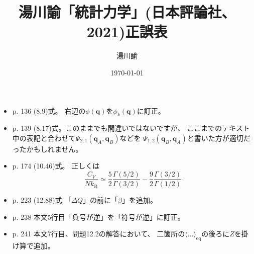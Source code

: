 \documentclass[dvipdfmx,uplatex]{jsarticle}
\begin{document}
\title{湯川諭「統計力学」(日本評論社、2021)正誤表}
\author{湯川諭}
\date{\today}
\maketitle
\begin{itemize}
\item
p. 136 (8.9)式。
右辺の$\phi(\boldsymbol{q})$を$\phi_{k}(\boldsymbol{q})$に訂正。
\item
p. 139 (8.17)式。このままでも間違いではないですが、
ここまでのテキスト中の表記と合わせて$\Psi_{2,1}(\boldsymbol{q}_{A}, \boldsymbol{q}_{B})$などを
$\Psi_{1,2}(\boldsymbol{q}_{B}, \boldsymbol{q}_{A})$と書いた方が適切だったかもしれません。

\item
p. 174 (10.46)式。
正しくは
\[
 \dfrac{C_V}{N k_\mathrm{B}}\simeq
 \dfrac{5}{2} \dfrac{\Gamma(5/2)}{\Gamma(3/2)} -
 \dfrac{9}{2} \dfrac{\Gamma(3/2)}{\Gamma(1/2)}
\]
\item
p. 223 (12.88)式 「$\Delta Q$」の前に「$\beta$」を追加。
\item
p. 238 本文5行目「負号が逆」を「符号が逆」に訂正。
\item
p. 241 本文7行目、問題12.2の解答において、 二箇所の$\langle \dots \rangle_{\mathrm{eq}}$の後ろに$Z$を掛け算で追加。
\end{itemize}
\end{document}
